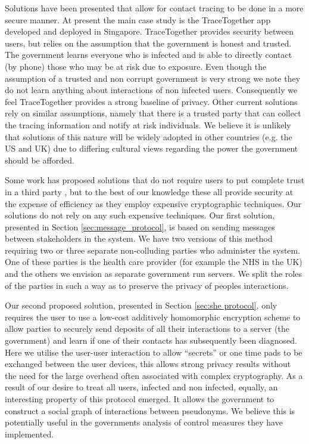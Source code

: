\documentclass{article}
\begin{document}
Solutions have been presented that allow for contact tracing to be done in a more secure manner. At present the main case study is the TraceTogether app  developed and deployed in Singapore. TraceTogether provides security between users, but relies on the assumption that the government is honest and trusted. The government learns everyone who is infected and is able to directly contact (by phone) those who may be at risk due to exposure. Even though the assumption of a trusted and non corrupt government is very strong we note they do not learn anything about interactions of non infected users. Consequently we feel TraceTogether provides a strong baseline of privacy. Other current solutions rely on similar assumptions, namely that there is a trusted party that can collect the tracing information and notify at risk individuals. We believe it is unlikely that solutions of this nature will be widely adopted in other countries (e.g. the US and UK) due to differing cultural views regarding the power the government should be afforded.

Some work has proposed solutions that do not require users to put complete trust in a third party \cite{DBLP:journals/corr/abs-2003-14412, DBLP:journals/corr/abs-2003-11511}, but to the best of our knowledge these all provide security at the expense of efficiency as they employ expensive cryptographic techniques. Our solutions do not rely on any such expensive techniques. Our first solution, presented in Section \ref{sec:message_protocol}, is based on sending messages between stakeholders in the system. We have two versions of this method requiring two or three separate non-colluding parties who administer the system. One of these parties is the health care provider (for example the NHS in the UK) and the others we envision as separate government run servers. We split the roles of the parties in such a way as to preserve the privacy of peoples interactions. 

Our second proposed solution, presented in Section \ref{sec:she protocol}, only requires the user to use a low-cost additively homomorphic encryption scheme to allow parties to securely send deposits of all their interactions to a server (the government) and learn if one of their contacts has subsequently been diagnosed. Here we utilise the user-user interaction to allow ``secrets'' or one time pads to be exchanged between the user devices, this allows strong privacy results without the need for the large overhead often associated with complex cryptography. As a result of our desire to treat all users, infected and non infected, equally, an interesting property of this protocol emerged. It allows the government to construct a social graph of interactions between pseudonyms. We believe this is potentially useful in the governments analysis of control measures they have implemented.
\end{document}

